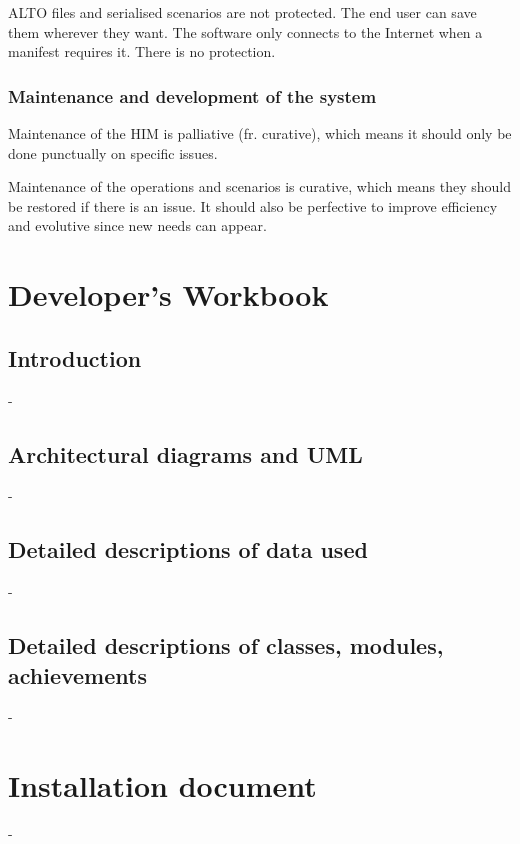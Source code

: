 \documentclass{polytech/polytech}
\numberwithin{figure}{chapter}
\begin{document}
\begin{appendix}
ALTO files and serialised scenarios are not protected. The end user can save them wherever they want.
The software only connects to the Internet when a manifest requires it. There is no protection.


\subsection{Maintenance and development of the system}

Maintenance of the HIM is palliative (fr. curative), which means it should only be done punctually on specific issues.

Maintenance of the operations and scenarios is curative, which means they should be restored if there is an issue. It should also be perfective to improve efficiency and evolutive since new needs can appear.



\chapter{Developer's Workbook}

\section{Introduction}

-

\section{Architectural diagrams and UML}

-

\section{Detailed descriptions of data used}

-

\section{Detailed descriptions of classes, modules, achievements}

-


\chapter{Installation document}

-


\end{appendix}
\end{document}
